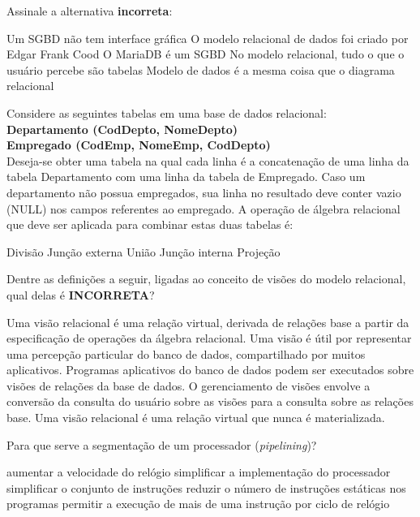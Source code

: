 \documentclass[12pt, addpoints]{exam}
\begin{document}
\begin{questions}
\question Assinale a alternativa \textbf{incorreta}:
\begin{choices}
\choice Um SGBD não tem interface gráfica
\choice O modelo relacional de dados foi criado por Edgar Frank Cood
\choice O MariaDB é um SGBD
\choice No modelo relacional, tudo o que o usuário percebe são tabelas
\choice Modelo de dados é a mesma coisa que o diagrama relacional
\end{choices}

\question

Considere as seguintes tabelas em uma base de dados relacional:\\

\textbf{Departamento (CodDepto, NomeDepto)}\\

\textbf{Empregado (CodEmp, NomeEmp, CodDepto)}\\

Deseja-se obter uma tabela na qual cada linha é a concatenação de uma linha da tabela Departamento com uma linha da tabela de Empregado. Caso um departamento não possua empregados, sua linha no resultado deve conter vazio (NULL) nos campos referentes ao empregado. A operação de álgebra relacional que deve ser aplicada para combinar estas duas tabelas é:
\begin{choices}
\choice Divisão
\choice Junção externa
\choice União
\choice Junção interna
\choice Projeção
\end{choices}

\question

Dentre as definições a seguir, ligadas ao conceito de visões do modelo relacional, qual delas é \textbf{INCORRETA}?


\begin{choices}
\choice Uma visão relacional é uma relação virtual, derivada de relações base a partir da especificação de operações da álgebra relacional.
\choice Uma visão é útil por representar uma percepção particular do banco de dados, compartilhado por muitos aplicativos.
\choice Programas aplicativos do banco de dados podem ser executados sobre visões de relações da base de dados.
\choice O gerenciamento de visões envolve a conversão da consulta do usuário sobre as visões para a consulta sobre as relações base.
\choice Uma visão relacional é uma relação virtual que nunca é materializada.
\end{choices}

\question

Para que serve a segmentação de um processador (\textit{pipelining})?
\begin{choices}
\choice aumentar a velocidade do relógio
\choice simplificar a implementação do processador
\choice simplificar o conjunto de instruções
\choice reduzir o número de instruções estáticas nos programas
\choice permitir a execução de mais de uma instrução por ciclo de relógio
\end{choices}


\end{questions}
\end{document}
